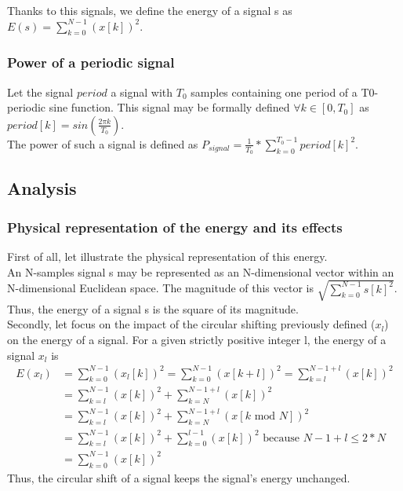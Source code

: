 \documentclass[a4paper]{article}
\begin{document}
Thanks to this signals, we define the energy of a signal s as $E(s) = \sum_{k=0}^{N-1}{(x[k])^2}$.\\


		\subsubsection{Power of a periodic signal}
Let the signal $period$ a signal with $T_{0}$ samples containing one period of a T0-periodic sine function.  This signal may be formally defined $\forall k \in [0, T_{0}]$ as $period[k] = sin(\frac{2 \pi k}{T_{0}})$.\\ 
The power of such a signal is defined as $P_{signal} = \frac{1}{T_{0}} * \sum_{k=0}^{T_{0}-1}{period[k]^2}$.\\



    \subsection{Analysis}
			\subsubsection{Physical representation of the energy and its effects}
First of all, let illustrate the physical representation of this energy.\\
An N-samples signal s may be represented as an N-dimensional vector within an N-dimensional Euclidean space.   The magnitude of this vector is $ \sqrt{\sum_{k=0}^{N-1}{s[k]^2}}$.   
Thus, the energy of a signal s is the square of its magnitude.\\

Secondly, let focus on the impact of the circular shifting previously defined ($x_{l}$) on the energy of a signal.
For a given strictly positive integer l, the energy of a signal $x_{l}$ is
\begin{equation*}
\begin{aligned}
  E(x_{l})	&= \sum_{k=0}^{N-1}{(x_{l}[k])^2}
		= \sum_{k=0}^{N-1}{(x[k+l])^2}
		= \sum_{k=l}^{N-1+l}{(x[k])^2}\\
		&= \sum_{k=l}^{N-1}{(x[k])^2} + \sum_{k=N}^{N-1+l}{(x[k])^2} \\
		&= \sum_{k=l}^{N-1}{(x[k])^2} + \sum_{k=N}^{N-1+l}{(x[k\mbox{ mod }N])^2} \\
		&= \sum_{k=l}^{N-1}{(x[k])^2} + \sum_{k=0}^{l-1}{(x[k])^2} \mbox{ because } N-1+l \leq 2*N \\
		&= \sum_{k=0}^{N-1}{(x[k])^2}
\end{aligned}
\end{equation*}
Thus, the circular shift of a signal keeps the signal's energy unchanged.
\end{document}
